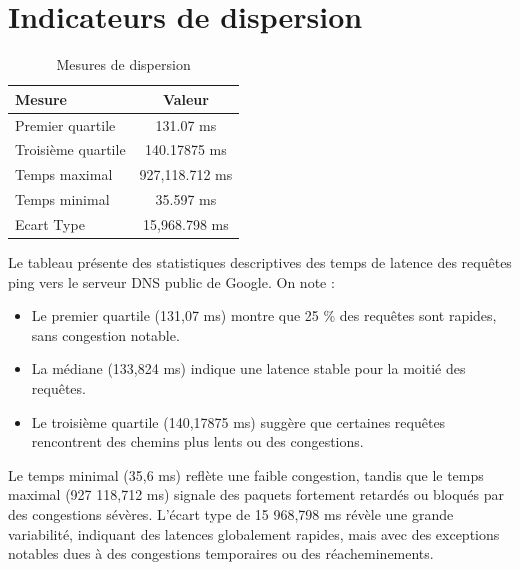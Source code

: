 \section{Indicateurs de  dispersion }
\begin{table}[H]	
	\captionsetup{justification=raggedright, singlelinecheck=false}
	\centering
	\caption{Mesures de dispersion}\vspace{-0.2cm}
	\fontsize{10}{20}\selectfont
	\begin{tabular}{||>{\raggedleft\arraybackslash}m{4cm}||c||}
		\hline
		\rowcolor{cyan}\textbf{Mesure} & \textbf{Valeur} \\
		\hline
		Premier quartile & 131.07 ms \\
		\hline
		Troisième quartile & 140.17875 ms \\
		\hline
		Temps maximal & 927,118.712 ms \\
		\hline
		Temps minimal & 35.597 ms \\
		\hline
		Ecart Type & 15,968.798 ms\\
		\hline
		\hline
	\end{tabular}
\end{table}
Le tableau présente des statistiques descriptives des temps de latence des requêtes ping vers le serveur DNS public de Google. On note :

\begin{itemize}
	\item Le premier quartile (131,07 ms) montre que 25 \% des requêtes sont rapides, sans congestion notable.
	\item La médiane (133,824 ms) indique une latence stable pour la moitié des requêtes.
	\item Le troisième quartile (140,17875 ms) suggère que certaines requêtes rencontrent des chemins plus lents ou des congestions.
\end{itemize}

Le temps minimal (35,6 ms) reflète une faible congestion, tandis que le temps maximal (927 118,712 ms) signale des paquets fortement retardés ou bloqués par des congestions sévères. L'écart type de 15 968,798 ms révèle une grande variabilité, indiquant des latences globalement rapides, mais avec des exceptions notables dues à des congestions temporaires ou des réacheminements.









